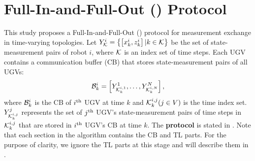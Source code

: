 \section{Full-In-and-Full-Out (\proto) Protocol}\label{sec:\proto}	
	This study proposes a Full-In-and-Full-Out (\proto) protocol for measurement exchange in time-varying topologies.
	Let \small$Y^i_{\mathcal{K}}=\left\lbrace \left[x^i_k,z^i_k\right]|k\in \mathcal{K}\right\rbrace$\normalsize 
	be the set of state-measurement pairs of robot $i$, where $\mathcal{K}$ is an index set of time steps.
	Each UGV contains a communication buffer (CB) that stores state-measurement pairs 
	of all UGVs:
	\small\begin{equation*}		
		\mathcal{B}^i_k=\left[ Y^1_{\mathcal{K}^{i,1}_k},\dots,Y^N_{\mathcal{K}^{i,N}_k}\right],
	\end{equation*}\normalsize
	where $\mathcal{B}^i_k$ is the CB of $i^\text{th}$ UGV at time $k$ and $\mathcal{K}^{i,j}_k (j\in V)$ is the time index set.
	$Y^j_{\mathcal{K}^{i,j}_k}$ represents the set of $j^\text{th}$ UGV's state-measurement pairs of time steps in $\mathcal{K}^{i,j}_k$ that are stored in $i^\text{th}$ UGV's CB at time $k$.
	The \textbf{{\proto} protocol} is stated in .
	Note that each section in the algorithm contains the CB and TL parts.
	For the purpose of clarity, we ignore the TL parts at this stage and will describe them in .
	
